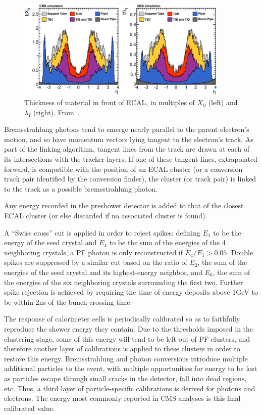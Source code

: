 \documentclass[oneside, letterpaper, 12pt, oldfontcommands]{memoir}
\begin{document}
\begin{figure}[hbtp]
  \begin{center}
    \includegraphics[width=0.90\textwidth]{Figures/tracker_thickness.png}
    \caption{
    Thickness of material in front of ECAL, in multiples of $X_{0}$ (left) and $\lambda_{I}$ (right). From~\cite{ref:1748-0221/9/10/P10009}.
    }
    \label{fig:tracker_thickness}
  \end{center}
\end{figure}

Bremsstrahlung photons tend to emerge nearly parallel to the parent electron's motion, and so have momentum vectors lying tangent to the electron's track.
As part of the linking algorithm, tangent lines from the track are drawn at each of its intersections with the tracker layers. If one of these tangent lines,
extrapolated forward, is compatible with the position of an ECAL cluster (or a conversion track pair identified by the conversion finder), the cluster (or track pair)
is linked to the track as a possible bremsstrahlung photon.

Any energy recorded in the preshower detector is added to that of the closest ECAL cluster (or else discarded if no associated cluster is found).

A ``Swiss cross'' cut is applied in order to reject spikes:
defining $E_{1}$ to be the energy of the seed crystal and $E_{4}$ to be the sum of the energies of the 4 neighboring crystals,
a PF photon is only reconstructed if $E_{4}/E_{1} > 0.05$. Double spikes are suppressed by a similar cut based on the ratio of $E_{2}$, the sum of the energies
of the seed crystal and its highest-energy neighbor, and $E_{6}$, the sum of the energies of the six neighboring crystals surrounding the first
two. Further spike rejection is achieved by requiring the time of energy deposits above 1\unit{GeV} to be within 2\unit{ns} of the bunch crossing time.

The response of calorimeter cells is periodically calibrated so as to faithfully reproduce the shower energy they contain.
Due to the thresholds imposed in the clustering stage, some of this energy will tend to be left out of PF clusters, and therefore another
layer of calibrations is applied to these clusters in order to restore this energy. Bremsstrahlung and photon conversions introduce multiple
additional particles to the event, with multiple opportunities for energy to be lost as particles escape through small cracks in the detector, fall into dead
regions, etc. Thus, a third layer of particle-specific calibrations is derived for photons and electrons. The energy most commonly reported in
CMS analyses is this final calibrated value.
\end{document}
